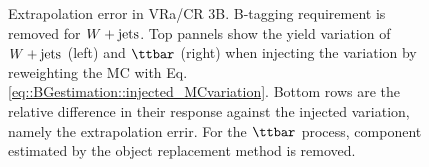 \begin{figure}[h]
  \centering
 \caption{Extrapolation error in VRa/CR 3B. B-tagging requirement is removed for $W+\mathrm{jets}$. Top pannels show the yield variation of $W+\mathrm{jets}$ (left) and $\ttbar$ (right) when injecting the variation by reweighting the MC with Eq. \ref{eq::BGestimation::injected_MCvariation}. Bottom rows are the relative difference in their response against the injected variation, namely the extrapolation errir. For the $\ttbar$ process, component estimated by the object replacement method is removed.  \label{fig::BGestimation::valid_extp_VRa6J} }
\end{figure}





